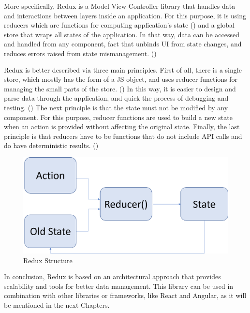 More specifically, Redux is a Model-View-Controller library that handles data and interactions between layers inside an application. For this purpose, it is using reducers which are functions for computing application's state (\cite{Reference15}) and a global store that wraps all states of the application. In that way, data can be accessed and handled from any component, fact that unbinds UI from state changes, and reduces errors raised from state mismanagement. (\cite{Reference10}) \par

Redux is better described via three main principles. First of all, there is a single store, which mostly has the form of a JS object, and uses reducer functions for managing the small parts of the store. (\cite{Reference13}) In this way, it is easier to design and parse data through the application, and quick the process of debugging and testing. (\cite{Reference17}) The next principle is that the state must not be modified by any component. For this purpose, reducer functions are used to build a new state when an action is provided without affecting the original state. Finally, the last principle is that reducers have to be functions that do not include API calls and do have deterministic results. (\cite{Reference13}) \par

\begin{figure}[h!]
	\begin{center}
		\includegraphics[scale=0.35]{images/Redux-Philosophy.png}
	\end{center}
	\caption{Redux Structure}
\end{figure}

In conclusion, Redux is based on an architectural approach that provides scalability and tools for better data management. This library can be used in combination with other libraries or frameworks, like React and Angular, as it will be mentioned in the next Chapters.

